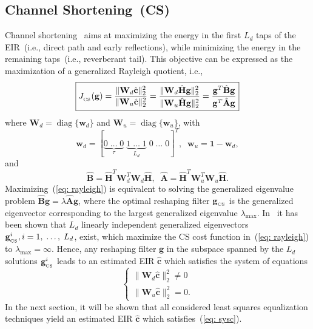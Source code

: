 \documentclass[11pt,draftcls,onecolumn]{IEEEtran}
\DeclareMathOperator{\diag}{diag}
\begin{document}
\subsection{Channel Shortening~(CS)}
Channel shortening~\cite{Zhang_IWAENC_2010, Kallinger_ICASSP_2006} aims at maximizing the energy in the first $L_d$ taps of the EIR~(i.e., direct path and early reflections), while minimizing the energy in the remaining taps~(i.e., reverberant tail).
This objective can be expressed as the maximization of a generalized Rayleigh quotient, i.e.,
\begin{equation}
\label{eq: rayleigh}
\boxed{J_{_{\rm CS}} (\mathbf{g}) = \frac{\|\mathbf{W}_d\hat{\mathbf{c}}\|_2^2}{\|\mathbf{W}_u\hat{\mathbf{c}}\|_2^2} =  \frac{\|\mathbf{W}_d\hat{\mathbf{H}}\mathbf{g}\|_2^2}{\|\mathbf{W}_u\hat{\mathbf{H}}\mathbf{g}\|_2^2} = \frac{\mathbf{g}^T \hat{\mathbf{B}} \mathbf{g}}{\mathbf{g}^T \hat{\mathbf{A}} \mathbf{g}}}
\end{equation}
where $\mathbf{W}_d = {\diag}\{\mathbf{w}_d\}$ and $\mathbf{W}_u = {\diag}\{\mathbf{w}_u\}$, with
\begin{equation}
\label{eq: wincs}
\mathbf{w}_d  = [\underbrace{0 \; \ldots \; 0}_{\tau} \; \underbrace{1 \; \ldots \; 1}_{L_d}\; 0\; \ldots\; 0]^{T}, \; \; \mathbf{w}_u  = \mathbf{1} - \mathbf{w}_d,
\end{equation}
and
\begin{equation}
\hat{\mathbf{B}}  = \hat{\mathbf{H}}^{T} \mathbf{W}_d^T \mathbf{W}_d\hat{\mathbf{H}},\; \;  \hat{\mathbf{A}} = \hat{\mathbf{H}}^{T} \mathbf{W}_u^T \mathbf{W}_u\hat{\mathbf{H}}.
\end{equation}
Maximizing~(\ref{eq: rayleigh}) is equivalent to solving the generalized eigenvalue problem $\hat{\mathbf{B}} \mathbf{g} = \lambda \hat{\mathbf{A}} \mathbf{g}$, where the optimal reshaping filter $\mathbf{g}_{_{\rm CS}}$ is the generalized eigenvector corresponding to the largest generalized eigenvalue $\lambda_{\max}$.
In~\cite{Zhang_IWAENC_2010} it has been shown that $L_d$ linearly independent generalized eigenvectors $\mathbf{g}_{_{\rm CS}}^i, i = 1, \; \ldots, \; L_d$, exist, which maximize the CS cost function in~(\ref{eq: rayleigh}) to $\lambda_{\max} = \infty$.
Hence, any reshaping filter $\mathbf{g}$ in the subspace spanned by the $L_d$ solutions $\mathbf{g}_{_{\rm CS}}^i$ leads to an estimated EIR $\hat{\mathbf{c}}$ which satisfies the system of equations
\begin{equation}
\label{eq: sysc}
\begin{cases}
\|\mathbf{W}_d \hat{\mathbf{c}} \|_2^2 \neq 0 \\
\|\mathbf{W}_u \hat{\mathbf{c}} \|_2^2 = 0.
\end{cases}
\end{equation} 
In the next section, it will be shown that all considered least squares equalization techniques yield an estimated EIR $\hat{\mathbf{c}}$ which satisfies~(\ref{eq: sysc}).
\end{document}
